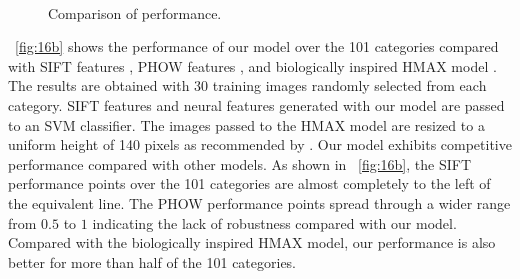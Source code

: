 \documentclass[9pt,twocolumn]{article}
\begin{document}
\begin{figure}
\centering
  \\
\caption{Comparison of performance.}
\label{fig:16}
\end{figure}

\figurename~\ref{fig:16b} shows
the performance of our model over the 101 categories
compared with SIFT features \cite{lowe1999},
PHOW features \cite{lazebnik2006},
and biologically inspired HMAX model \cite{serre2007}.
The results are obtained with 30 training images randomly selected 
from each category.
SIFT features and neural features generated with our model
are passed to an SVM classifier.
The images passed to the HMAX model are resized 
to a uniform height of 140 pixels as recommended by \cite{serre2007}.
Our model exhibits competitive performance 
compared with other models.
As shown in \figurename~\ref{fig:16b},
the SIFT performance points over the 101 categories
are almost completely to the left of the equivalent line.
The PHOW performance points spread through 
a wider range from $0.5$ to $1$ indicating 
the lack of robustness compared with our model.
Compared with the biologically inspired HMAX model,
our performance is also better for more than half
of the 101 categories.
\end{document}
